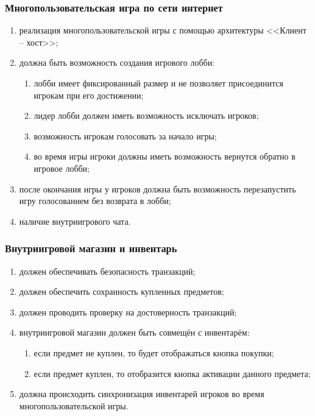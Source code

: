 \subsubsection{Многопользовательская игра по сети интернет}

\begin{enumerate}
    \item реализация многопользовательской игры с помощью архитектуры <<Клиент -- хост>>;
    \item должна быть возможность создания игрового лобби:
    \begin{enumerate}
        \item лобби имеет фиксированный размер и не позволяет присоединится игрокам при его достижении;
        \item лидер лобби должен иметь возможность исключать игроков;
        \item возможность игрокам голосовать за начало игры;
        \item во время игры игроки должны иметь возможность вернутся обратно в игровое лобби;
    \end{enumerate}
    \item после окончания игры у игроков должна быть возможность перезапустить игру голосованием без возврата в лобби;
    \item наличие внутриигрового чата.
\end{enumerate}


\subsubsection{Внутриигровой магазин и инвентарь}

\begin{enumerate}
    \item должен обеспечивать безопасность транзакций;
    \item должен обеспечить сохранность купленных предметов;
    \item должен проводить проверку на достоверность транзакций;
    \item внутриигровой магазин должен быть совмещён с инвентарём:
    \begin{enumerate}
        \item если предмет не куплен, то будет отображаться кнопка покупки;
        \item если предмет куплен, то отобразится кнопка активации данного предмета;
    \end{enumerate}
    \item должна происходить синхронизация инвентарей игроков во время многопользовательской игры.
\end{enumerate}


